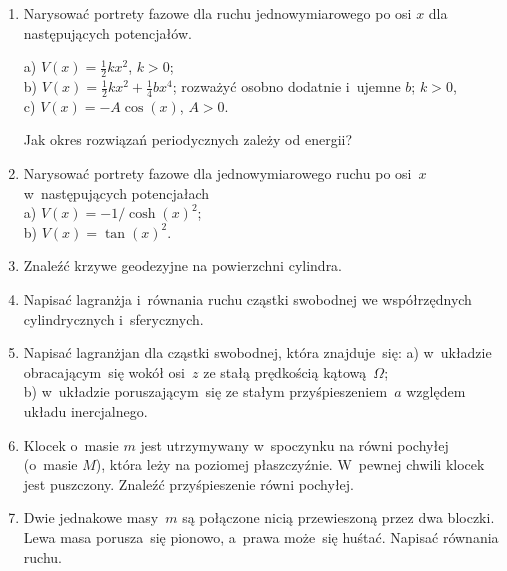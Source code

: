 \documentclass[a4paper,11pt]{article}
\begin{document}
\begin{enumerate}

\item Narysować portrety fazowe dla ruchu jednowymiarowego po osi $x$ dla
  następujących potencjałów.

  a) $V( x ) = \frac{ 1 }{ 2 } k x^{ 2 }$, $k > 0$; \\
  b) $V( x ) = \frac{ 1 }{ 2 } k x^{ 2 } + \frac{ 1 }{ 4 } b x^{ 4 }$;
  rozważyć osobno dodatnie i~ujemne $b$;
  $k > 0$, \\
  c) $V( x ) = -A \cos( x )$, $A > 0$.

  Jak okres rozwiązań periodycznych zależy od energii?



\item Narysować portrety fazowe dla jednowymiarowego ruchu po osi~$x$
  w~następujących potencjałach \\
  a) $V( x ) = -1 / \cosh( x )^{ 2 }$; \\
  b) $V( x ) = \tan( x )^{ 2 }$.



\item Znaleźć krzywe geodezyjne na powierzchni cylindra.



\item Napisać lagranżja i~równania ruchu cząstki swobodnej we współrzędnych
  cylindrycznych i~sferycznych.



\item Napisać lagranżjan dla cząstki swobodnej, która znajduje~się:
  a) w~układzie obracającym~się wokół osi~$z$ ze stałą prędkością
  kątową~$\Omega$; \\
  b) w~układzie poruszającym~się ze stałym przyśpieszeniem~$a$ względem
  układu inercjalnego.



\item Klocek o~masie $m$ jest utrzymywany w~spoczynku na równi pochyłej
  (o~masie $M$), która leży na poziomej płaszczyźnie. W~pewnej chwili klocek
  jest puszczony. Znaleźć przyśpieszenie równi pochyłej.



\item Dwie jednakowe masy~$m$ są połączone nicią przewieszoną przez dwa
  bloczki. Lewa masa porusza~się pionowo, a~prawa może~się huśtać. Napisać
  równania ruchu.




\end{enumerate}
\end{document}
